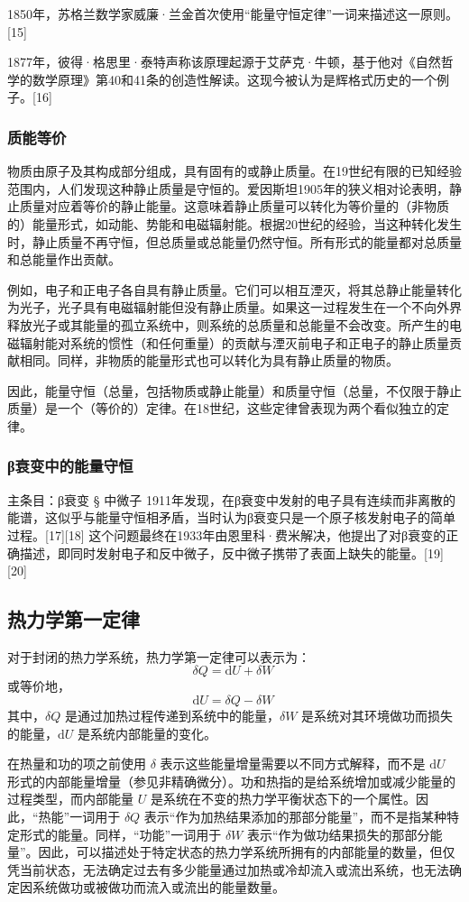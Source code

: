 1850年，苏格兰数学家威廉·兰金首次使用“能量守恒定律”一词来描述这一原则。[15]

1877年，彼得·格思里·泰特声称该原理起源于艾萨克·牛顿，基于他对《自然哲学的数学原理》第40和41条的创造性解读。这现今被认为是辉格式历史的一个例子。[16]
\subsubsection{质能等价}
物质由原子及其构成部分组成，具有固有的或静止质量。在19世纪有限的已知经验范围内，人们发现这种静止质量是守恒的。爱因斯坦1905年的狭义相对论表明，静止质量对应着等价的静止能量。这意味着静止质量可以转化为等价量的（非物质的）能量形式，如动能、势能和电磁辐射能。根据20世纪的经验，当这种转化发生时，静止质量不再守恒，但总质量或总能量仍然守恒。所有形式的能量都对总质量和总能量作出贡献。

例如，电子和正电子各自具有静止质量。它们可以相互湮灭，将其总静止能量转化为光子，光子具有电磁辐射能但没有静止质量。如果这一过程发生在一个不向外界释放光子或其能量的孤立系统中，则系统的总质量和总能量不会改变。所产生的电磁辐射能对系统的惯性（和任何重量）的贡献与湮灭前电子和正电子的静止质量贡献相同。同样，非物质的能量形式也可以转化为具有静止质量的物质。

因此，能量守恒（总量，包括物质或静止能量）和质量守恒（总量，不仅限于静止质量）是一个（等价的）定律。在18世纪，这些定律曾表现为两个看似独立的定律。
\subsubsection{β衰变中的能量守恒}  
主条目：β衰变 § 中微子  
1911年发现，在β衰变中发射的电子具有连续而非离散的能谱，这似乎与能量守恒相矛盾，当时认为β衰变只是一个原子核发射电子的简单过程。[17][18] 这个问题最终在1933年由恩里科·费米解决，他提出了对β衰变的正确描述，即同时发射电子和反中微子，反中微子携带了表面上缺失的能量。[19][20]
\subsection{热力学第一定律} 
对于封闭的热力学系统，热力学第一定律可以表示为：
\[
\delta Q = \mathrm{d}U + \delta W~
\]
或等价地，
\[
\mathrm{d}U = \delta Q - \delta W~
\]
其中，\( \delta Q \) 是通过加热过程传递到系统中的能量，\( \delta W \) 是系统对其环境做功而损失的能量，\( \mathrm{d}U \) 是系统内部能量的变化。

在热量和功的项之前使用 \( \delta \) 表示这些能量增量需要以不同方式解释，而不是 \( \mathrm{d}U \) 形式的内部能量增量（参见非精确微分）。功和热指的是给系统增加或减少能量的过程类型，而内部能量 \( U \) 是系统在不变的热力学平衡状态下的一个属性。因此，“热能”一词用于 \( \delta Q \) 表示“作为加热结果添加的那部分能量”，而不是指某种特定形式的能量。同样，“功能”一词用于 \( \delta W \) 表示“作为做功结果损失的那部分能量”。因此，可以描述处于特定状态的热力学系统所拥有的内部能量的数量，但仅凭当前状态，无法确定过去有多少能量通过加热或冷却流入或流出系统，也无法确定因系统做功或被做功而流入或流出的能量数量。

